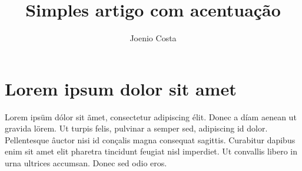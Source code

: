 \documentclass{article}
\begin{document}
\title{Simples artigo com acentuação}

\author{Joenio Costa}

\maketitle

\section{Lorem ipsum dolor sit amet}

Lorem ipsüm dólor sit ãmet, consectetur adipiscing élit. Donec a díam aenean
ut gravida lörem. Ut turpis felis, pulvinar a semper sed, adipiscing id dolor.
Pellentesque âuctor nisi id conçalis magna consequat sagittis.  Curabitur
dapibus enim sit amet elit pharetra tincidunt feugiat nisl imperdiet. Ut
convallis libero in urna ultrices accumsan. Donec sed odio eros.
\end{document}
